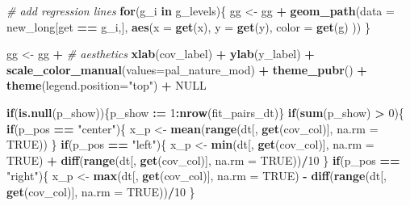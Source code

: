 \documentclass[]{book}
\newenvironment{Shaded}{\begin{snugshade}}{\end{snugshade}}
\newcommand{\CommentTok}[1]{\textcolor[rgb]{0.56,0.35,0.01}{\textit{#1}}}
\newcommand{\ControlFlowTok}[1]{\textcolor[rgb]{0.13,0.29,0.53}{\textbf{#1}}}
\newcommand{\DataTypeTok}[1]{\textcolor[rgb]{0.13,0.29,0.53}{#1}}
\newcommand{\DecValTok}[1]{\textcolor[rgb]{0.00,0.00,0.81}{#1}}
\newcommand{\ErrorTok}[1]{\textcolor[rgb]{0.64,0.00,0.00}{\textbf{#1}}}
\newcommand{\KeywordTok}[1]{\textcolor[rgb]{0.13,0.29,0.53}{\textbf{#1}}}
\newcommand{\NormalTok}[1]{#1}
\newcommand{\OperatorTok}[1]{\textcolor[rgb]{0.81,0.36,0.00}{\textbf{#1}}}
\newcommand{\OtherTok}[1]{\textcolor[rgb]{0.56,0.35,0.01}{#1}}
\newcommand{\StringTok}[1]{\textcolor[rgb]{0.31,0.60,0.02}{#1}}
\begin{document}
\begin{Shaded}
\begin{Highlighting}[]
  \CommentTok{# add regression lines}
  \ControlFlowTok{for}\NormalTok{(g_i }\ControlFlowTok{in}\NormalTok{ g_levels)\{}
\NormalTok{    gg <-}\StringTok{ }\NormalTok{gg }\OperatorTok{+}
\StringTok{      }\KeywordTok{geom_path}\NormalTok{(}\DataTypeTok{data =}\NormalTok{ new_long[get }\OperatorTok{==}\StringTok{ }\NormalTok{g_i,],}
                \KeywordTok{aes}\NormalTok{(}\DataTypeTok{x =} \KeywordTok{get}\NormalTok{(x),}
                    \DataTypeTok{y =} \KeywordTok{get}\NormalTok{(y),}
                    \DataTypeTok{color =} \KeywordTok{get}\NormalTok{(g)}
\NormalTok{                ))}
\NormalTok{  \}}
  

\NormalTok{  gg <-}\StringTok{ }\NormalTok{gg }\OperatorTok{+}\StringTok{ }\CommentTok{# aesthetics}
\StringTok{    }\KeywordTok{xlab}\NormalTok{(cov_label) }\OperatorTok{+}
\StringTok{    }\KeywordTok{ylab}\NormalTok{(y_label) }\OperatorTok{+}
\StringTok{    }\KeywordTok{scale_color_manual}\NormalTok{(}\DataTypeTok{values=}\NormalTok{pal_nature_mod) }\OperatorTok{+}
\StringTok{    }\KeywordTok{theme_pubr}\NormalTok{() }\OperatorTok{+}
\StringTok{    }\KeywordTok{theme}\NormalTok{(}\DataTypeTok{legend.position=}\StringTok{"top"}\NormalTok{) }\OperatorTok{+}
\StringTok{    }
\StringTok{    }\OtherTok{NULL}

  \ControlFlowTok{if}\NormalTok{(}\KeywordTok{is.null}\NormalTok{(p_show))\{p_show }\OperatorTok{:}\ErrorTok{=}\StringTok{ }\DecValTok{1}\OperatorTok{:}\KeywordTok{nrow}\NormalTok{(fit_pairs_dt)\}}
  \ControlFlowTok{if}\NormalTok{(}\KeywordTok{sum}\NormalTok{(p_show) }\OperatorTok{>}\StringTok{ }\DecValTok{0}\NormalTok{)\{}
    \ControlFlowTok{if}\NormalTok{(p_pos }\OperatorTok{==}\StringTok{ "center"}\NormalTok{)\{}
\NormalTok{      x_p <-}\StringTok{ }\KeywordTok{mean}\NormalTok{(}\KeywordTok{range}\NormalTok{(dt[, }\KeywordTok{get}\NormalTok{(cov_col)], }\DataTypeTok{na.rm =} \OtherTok{TRUE}\NormalTok{))}
\NormalTok{    \}}
    \ControlFlowTok{if}\NormalTok{(p_pos }\OperatorTok{==}\StringTok{ "left"}\NormalTok{)\{}
\NormalTok{      x_p <-}\StringTok{ }\KeywordTok{min}\NormalTok{(dt[, }\KeywordTok{get}\NormalTok{(cov_col)], }\DataTypeTok{na.rm =} \OtherTok{TRUE}\NormalTok{) }\OperatorTok{+}\StringTok{ }\KeywordTok{diff}\NormalTok{(}\KeywordTok{range}\NormalTok{(dt[, }\KeywordTok{get}\NormalTok{(cov_col)], }\DataTypeTok{na.rm =} \OtherTok{TRUE}\NormalTok{))}\OperatorTok{/}\DecValTok{10}
\NormalTok{    \}}
    \ControlFlowTok{if}\NormalTok{(p_pos }\OperatorTok{==}\StringTok{ "right"}\NormalTok{)\{}
\NormalTok{      x_p <-}\StringTok{ }\KeywordTok{max}\NormalTok{(dt[, }\KeywordTok{get}\NormalTok{(cov_col)], }\DataTypeTok{na.rm =} \OtherTok{TRUE}\NormalTok{) }\OperatorTok{-}\StringTok{ }\KeywordTok{diff}\NormalTok{(}\KeywordTok{range}\NormalTok{(dt[, }\KeywordTok{get}\NormalTok{(cov_col)], }\DataTypeTok{na.rm =} \OtherTok{TRUE}\NormalTok{))}\OperatorTok{/}\DecValTok{10}
\NormalTok{    \}}
    

\end{Highlighting}
\end{Shaded}
\end{document}
